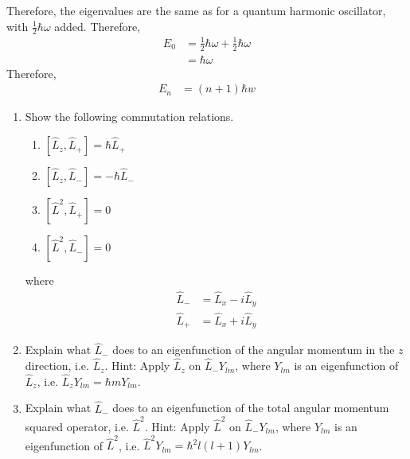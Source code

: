 \documentclass[fleqn, a4paper, 11pt, oneside]{amsart}
\theoremstyle{definition}
\theoremstyle{theorem}
\begin{document}
\begin{solution}
\begin{enumerate}[leftmargin=*]
\begin{enumerate}[leftmargin=*]
					Therefore, the eigenvalues are the same as for a quantum harmonic oscillator, with $\frac{1}{2} \hbar \omega$ added.
					Therefore,
					\begin{align*}
						E_0 & = \frac{1}{2} \hbar \omega + \frac{1}{2} \hbar \omega \\
                                                    & = \hbar \omega
					\end{align*}
					Therefore,
					\begin{align*}
						E_n & = (n + 1) \hbar w
					\end{align*}
			\end{enumerate}
	\end{enumerate}
\end{solution}

\begin{question}
	\begin{enumerate}
		\item
			Show the following commutation relations.
			\begin{enumerate}
				\item $\left[ \hat{L}_z,\hat{L}_+ \right] = \hbar \hat{L}_+$
				\item $\left[ \hat{L}_z,\hat{L}_- \right] = -\hbar \hat{L}_-$
				\item $\left[ \hat{L}^2,\hat{L}_+ \right] = 0$
				\item $\left[ \hat{L}^2,\hat{L}_- \right] = 0$
			\end{enumerate}
			where
			\begin{align*}
				\hat{L}_- & = \hat{L}_x - i \hat{L}_y \\
				\hat{L}_+ & = \hat{L}_x + i \hat{L}_y
			\end{align*}
		\item
			Explain what $\hat{L}_-$ does to an eigenfunction of the angular momentum in the $z$ direction, i.e. $\hat{L}_z$.
			Hint: Apply $\hat{L}_z$ on $\hat{L}_- Y_{l m}$, where $Y_{l m}$ is an eigenfunction of $\hat{L}_z$, i.e. $\hat{L}_z Y_{l m} = \hbar m Y_{l m}$.
		\item
			Explain what $\hat{L}_-$ does to an eigenfunction of the total angular momentum squared operator, i.e. $\hat{L}^2$.
			Hint: Apply $\hat{L}^2$ on $\hat{L}_- Y_{l m}$, where $Y_{l m}$ is an eigenfunction of $\hat{L}^2$, i.e. $\hat{L}^2 Y_{l m} = \hbar^2 l (l + 1) Y_{l m}$.
	\end{enumerate}
\end{question}
\end{document}

